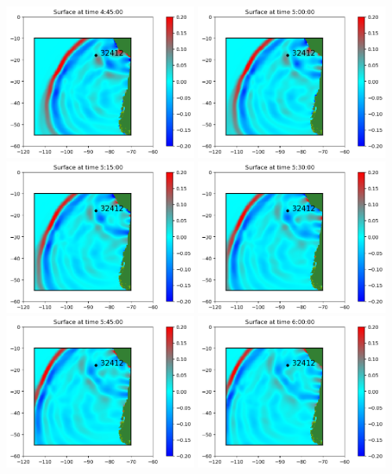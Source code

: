 \documentclass[11pt]{article}
\begin{document}
\vskip 10pt 
\includegraphics[width=0.475\textwidth]{fgout0001frame0020fig0.png}
\vskip 10pt 
\includegraphics[width=0.475\textwidth]{fgout0001frame0021fig0.png}
\vskip 10pt 
\includegraphics[width=0.475\textwidth]{fgout0001frame0022fig0.png}
\vskip 10pt 
\includegraphics[width=0.475\textwidth]{fgout0001frame0023fig0.png}
\vskip 10pt 
\includegraphics[width=0.475\textwidth]{fgout0001frame0024fig0.png}
\vskip 10pt 
\includegraphics[width=0.475\textwidth]{fgout0001frame0025fig0.png}
\end{document}

